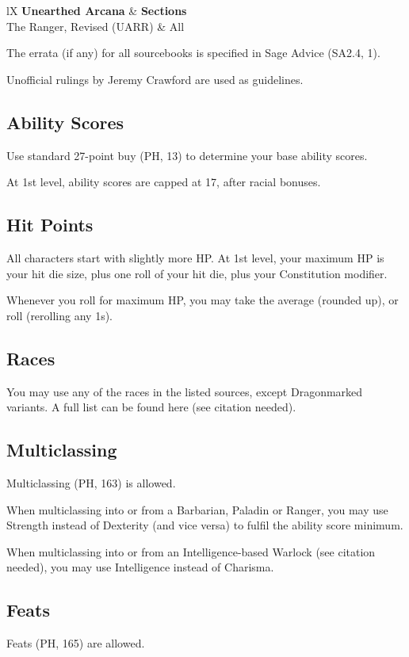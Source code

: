 \documentclass[letterpaper,twocolumn,openany,nodeprecatedcode]{dndbook}
\begin{document}
\begin{DndTable}[]{lX}
    \textbf{Unearthed Arcana} & \textbf{Sections} \\
    The Ranger, Revised (UARR) & All \\
\end{DndTable}

The errata (if any) for all sourcebooks is specified in Sage Advice (SA2.4, 1).

Unofficial rulings by Jeremy Crawford are used as guidelines.

\subsection{Ability Scores}
Use standard 27-point buy (PH, 13) to determine your base ability scores. 

At 1st level, ability scores are capped at 17, after racial bonuses.

\subsection{Hit Points}
All characters start with slightly more HP. At 1st level, your maximum HP is your hit die size, plus one roll of your hit die, plus your Constitution modifier.

Whenever you roll for maximum HP, you may take the average (rounded up), or roll (rerolling any 1s).

\subsection{Races}
You may use any of the races in the listed sources, except Dragonmarked variants. A full list can be found here (see citation needed). 

\subsection{Multiclassing}
Multiclassing (PH, 163) is allowed. 

When multiclassing into or from a Barbarian, Paladin or Ranger, you may use Strength instead of Dexterity (and vice versa) to fulfil the ability score minimum. 

When multiclassing into or from an Intelligence-based Warlock (see citation needed), you may use Intelligence instead of Charisma.

\subsection{Feats}
Feats (PH, 165) are allowed. 
\end{document}
